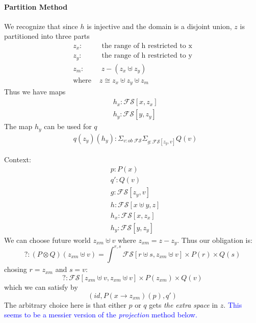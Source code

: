 \documentclass{article}
\newcommand{\blue}[1]{\textcolor{blue}{#1}}
\begin{document}
\paragraph{Partition Method}
We recognize that since $h$ is injective and the domain is a disjoint union, $z$ is partitioned into three parts
\begin{align*}
    z_x :& \textrm{ the range of h restricted to x}\\
    z_y :& \textrm{ the range of h restricted to y}\\
    z_m :& \; z - (z_x \uplus z_y)\\
    \textrm{where } & z \cong z_x \uplus z_y \uplus z_m
\end{align*}
Thus we have maps
\begin{align*}
    &h_x: \mathcal{FS}[x , z_x]\\
    &h_y: \mathcal{FS}[y , z_y]
\end{align*}
The map $h_y$ can be used for $q$
\begin{align*}
        &q(z_y)(h_y) : \Sigma_{v : ob \;\mathcal{FS}}\Sigma_{g : \mathcal{FS}[ z_y , v ]}Q(v)
\end{align*}

Context:
\begin{align*}
    &p : P(x)\\
    &q' : Q(v)\\
    &g : \mathcal{FS}[ z_y , v ]\\
    &h : \mathcal{FS}[x\uplus y , z]\\
    &h_x: \mathcal{FS}[x , z_x]\\
    &h_y: \mathcal{FS}[y , z_y]
\end{align*}
We can choose future world $z_{xm} \uplus v$ where $z_{xm} = z - z_y$.
Thus our obligation is:
\[
    ? : (P \otimes Q)(z_{xm} \uplus v) = \int_{}^{r,s} \mathcal{FS}[r \uplus s,z_{xm} \uplus v ] 
    \times P(r) \times Q(s)
\]
chosing $r = z_{xm}$ and $s = v$:
\[
    ? : \mathcal{FS}[z_{xm} \uplus v,z_{xm} \uplus v ] \times P(z_{xm}) \times Q(v)
\]
which we can satisfy by 
\[
  (id, P(x\rightarrow z_{xm})(p), q')  
\]
The arbitrary choice here is that either $p$ or $q$ gets \textit{the extra space} in $z$.
\blue{This seems to be a messier version of the \textit{projection} method below. }
\end{document}
